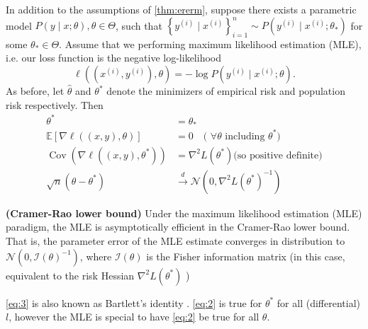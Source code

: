 \documentclass{article}
\newcommand{\bfs}[1]{\textbf{({#1}) }}
\begin{document}
\begin{thma}
In addition to the assumptions of \cref{thm:ererm}, suppose there exists a parametric model $P(y \mid x ; \theta), \theta \in \Theta$, such that $\left\{y^{(i)} \mid x^{(i)}\right\}_{i=1}^{n} \sim P\left(y^{(i)} \mid x^{(i)} ; \theta_{*}\right)$ for some $\theta_{*} \in \Theta .$ Assume that we performing maximum likelihood estimation (MLE), i.e. our loss function is the negative log-likelihood $$\ell\left(\left(x^{(i)}, y^{(i)}\right), \theta\right)=-\log P\left(y^{(i)} \mid x^{(i)} ; \theta\right) .$$ As before, let $\hat{\theta}$ and $\theta^{*}$ denote the minimizers of empirical risk and population risk respectively. Then
\begin{align}
\theta^{*}&=\theta_{*} \label{eq:1}\\
\mathbb{E}\left[\nabla \ell\left((x, y), \theta\right)\right]&=0  \quad \text{( $\forall \theta $ including $\theta^{*}$)}\label{eq:2}\\
\operatorname{Cov}\left(\nabla \ell\left((x, y), \theta^{*}\right)\right)&=\nabla^{2} L\left(\theta^{*}\right) \text{(so positive definite)} \label{eq:3}\\
\sqrt{n}\left(\hat{\theta}-\theta^{*}\right) &\stackrel{d}{\rightarrow} \mathcal{N}\left(0, \nabla^{2} L\left(\theta^{*}\right)^{-1}\right)\label{eq:4}
\end{align}
\end{thma} 
\begin{rema}\bfs{Cramer-Rao lower bound}
Under the maximum likelihood estimation (MLE) paradigm, the MLE is asymptotically efficient in the Cramer-Rao lower bound. That is, the parameter error of the MLE estimate converges in distribution to $\mathcal{N}\left(0, \mathcal{I}(\theta)^{-1}\right)$, where $\mathcal{I}(\theta)$ is the Fisher information matrix (in this case, equivalent to the risk Hessian $\nabla^{2} L\left(\theta^{*}\right)$ ) \cite{Rice}
\end{rema}
\begin{rema}
\cref{eq:3} is also known as Bartlett's identity \cite{Liang}.  \cref{eq:2} is true for $\theta^*$ for all (differential) $l$, however the MLE is special to have  \cref{eq:2} be true for all $\theta$.
\end{rema} 
\end{document}
